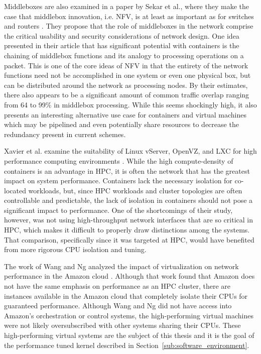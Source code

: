 Middleboxes are also examined in a paper by Sekar et al., where they make the case that middlebox innovation, i.e. NFV, is at least as important as for switches and routers \autocite{sekar2011middlebox}.
They propose that the role of middleboxes in the network comprise the critical usability and security considerations of network design.
One idea presented in their article that has significant potential with containers is the chaining of middlebox functions and its analogy to processing operations on a packet.  
This is one of the core ideas of NFV in that the entirety of the network functions need not be accomplished in one system or even one physical box, but can be distributed around the network as processing nodes.  
By their estimates, there also appears to be a significant amount of common traffic overlap ranging from 64 to 99\% in middlebox processing. 
While this seems shockingly high, it also presents an interesting alternative use case for containers and virtual machines which may be pipelined and even potentially share resources to decrease the redundancy present in current schemes.

Xavier et al. examine the suitability of Linux vServer, OpenVZ, and LXC for high performance computing environments \autocite{xavier2013performance}.
While the high compute-density of containers is an advantage in HPC, it is often the network that has the greatest impact on system performance.
Containers lack the necessary isolation for co-located workloads, but, since HPC workloads and cluster topologies are often controllable and predictable, the lack of isolation in containers should not pose a significant impact to performance.
One of the shortcomings of their study, however, was not using high-throughput network interfaces that are so critical in HPC, which makes it difficult to properly draw distinctions among the systems.
That comparison, specifically since it was targeted at HPC, would have benefited from more rigorous CPU isolation and tuning.  

The work of Wang and Ng analyzed the impact of virtualization on network performance in the Amazon cloud \autocite{wangAmazon2010}.
Although that work found that Amazon does not have the same emphasis on performance as an HPC cluster, there are instances available in the Amazon cloud that completely isolate their CPUs for guaranteed performance.  
Although Wang and Ng did not have access into Amazon's orchestration or control systems, the high-performing virtual machines were not likely oversubscribed with other systems sharing their CPUs. 
These high-performing virtual systems are the subject of this thesis and it is the goal of the performance tuned kernel described in Section~\ref{sub:software_environment}.  

